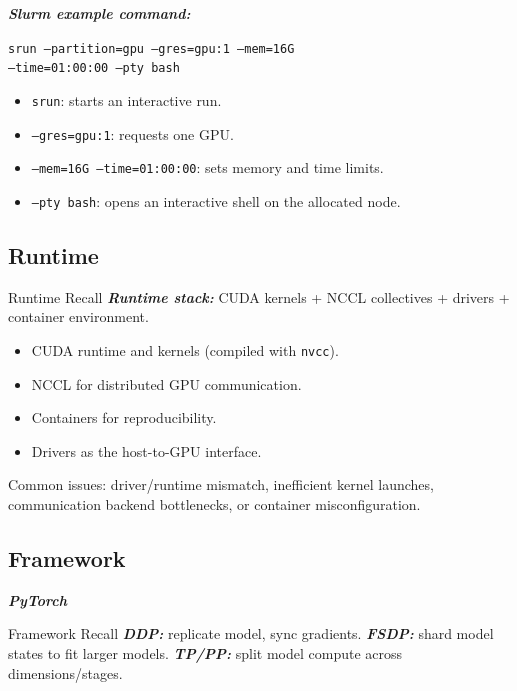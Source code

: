 \documentclass[12pt]{article}
\let\origtextbf\textbf
\renewcommand{\textbf}[1]{\origtextbf{\textit{#1}}}
\begin{document}
\vspace{0.4cm}
\textbf{Slurm example command:}
\begin{center}
\small
\texttt{srun --partition=gpu --gres=gpu:1 --mem=16G}\\
\texttt{--time=01:00:00 --pty bash}
\normalsize
\end{center}

\begin{itemize}
\item \texttt{srun}: starts an interactive run.
\item \texttt{--gres=gpu:1}: requests one GPU.
\item \texttt{--mem=16G --time=01:00:00}: sets memory and time limits.
\item \texttt{--pty bash}: opens an interactive shell on the allocated node.
\end{itemize}

\subsection{Runtime}
\begin{bluebox}{Runtime Recall}
\textbf{Runtime stack:} CUDA kernels + NCCL collectives + drivers + container environment.
\end{bluebox}

\begin{itemize}
\item CUDA runtime and kernels (compiled with \texttt{nvcc}).
\item NCCL for distributed GPU communication.
\item Containers for reproducibility.
\item Drivers as the host-to-GPU interface.
\end{itemize}

Common issues: driver/runtime mismatch, inefficient kernel launches, communication backend bottlenecks, or container misconfiguration.

\subsection{Framework}
\textbf{PyTorch}

\begin{bluebox}{Framework Recall}
\textbf{DDP:} replicate model, sync gradients.  
\textbf{FSDP:} shard model states to fit larger models.  
\textbf{TP/PP:} split model compute across dimensions/stages.
\end{bluebox}
\end{document}
